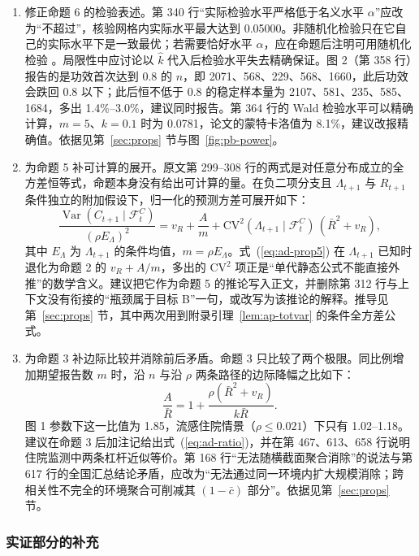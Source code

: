 \begin{enumerate}
\item 修正命题 6 的检验表述。第 340 行“实际检验水平严格低于名义水平 $\alpha$”应改为“不超过”，核验网格内实际水平最大达到 0.05000。非随机化检验只在它自己的实际水平下是一致最优；若需要恰好水平 $\alpha$，应在命题后注明可用随机化检验 \citep{karlin1956theory,lehmann2005testing}。局限性中应讨论以 $\hat k$ 代入后检验水平失去精确保证。图 2（第 358 行）报告的是功效首次达到 0.8 的 $n$，即 2071、568、229、568、1660，此后功效会跌回 0.8 以下；此后恒不低于 0.8 的稳定样本量为 2107、581、235、585、1684，多出 1.4\%--3.0\%，建议同时报告。第 364 行的 Wald 检验水平可以精确计算，$m=5$、$k=0.1$ 时为 0.0781，论文的蒙特卡洛值为 8.1\%，建议改报精确值。依据见第~\ref{sec:props} 节与图~\ref{fig:pb-power}。

\item 为命题 5 补可计算的展开。原文第 299--308 行的两式是对任意分布成立的全方差恒等式，命题本身没有给出可计算的量。在负二项分支且 $\Lambda_{t+1}$ 与 $R_{t+1}$ 条件独立的附加假设下，归一化的预测方差可展开如下：
\begin{equation}\label{eq:ad-prop5}
\frac{\operatorname{Var}(C_{t+1}\mid\mathcal F_t^C)}{(\rho E_\Lambda)^2}=v_R+\frac{A}{m}+\mathrm{CV}^2(\Lambda_{t+1}\mid\mathcal F_t^C)\,(\bar R^2+v_R),
\end{equation}
其中 $E_\Lambda$ 为 $\Lambda_{t+1}$ 的条件均值，$m=\rho E_\Lambda$。式~(\ref{eq:ad-prop5}) 在 $\Lambda_{t+1}$ 已知时退化为命题 2 的 $v_R+A/m$，多出的 $\mathrm{CV}^2$ 项正是“单代静态公式不能直接外推”的数学含义。建议把它作为命题 5 的推论写入正文，并删除第 312 行与上下文没有衔接的“瓶颈属于目标 B”一句，或改写为该推论的解释。推导见第~\ref{sec:props} 节，其中两次用到附录引理~\ref{lem:ap-totvar} 的条件全方差公式。

\item 为命题 3 补边际比较并消除前后矛盾。命题 3 只比较了两个极限。同比例增加期望报告数 $m$ 时，沿 $n$ 与沿 $\rho$ 两条路径的边际降幅之比如下：
\begin{equation}\label{eq:ad-ratio}
\frac{A}{\bar R}=1+\frac{\rho(\bar R^2+v_R)}{k\bar R}.
\end{equation}
图 1 参数下这一比值为 1.85，流感住院情景（$\rho\le0.021$）下只有 1.02--1.18。建议在命题 3 后加注记给出式~(\ref{eq:ad-ratio})，并在第 467、613、658 行说明住院监测中两条杠杆近似等价。第 168 行“无法随横截面聚合消除”的说法与第 617 行的全国汇总结论矛盾，应改为“无法通过同一环境内扩大规模消除；跨相关性不完全的环境聚合可削减其 $(1-\bar c)$ 部分”。依据见第~\ref{sec:props} 节。
\end{enumerate}

\subsubsection{实证部分的补充}

